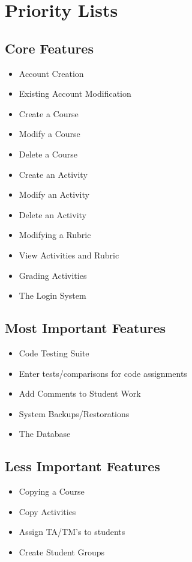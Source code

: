 \documentclass{article}
\begin{document}
\section{Priority Lists}
\subsection{Core Features}
\begin{itemize}
  \item Account Creation
  \item Existing Account Modification
  \item Create a Course
  \item Modify a Course
  \item Delete a Course
  \item Create an Activity
  \item Modify an Activity
  \item Delete an Activity
  \item Modifying a Rubric
  \item View Activities and Rubric
  \item Grading Activities
  \item The Login System
\end{itemize}

\subsection{Most Important Features}
\begin{itemize}
  \item Code Testing Suite
  \item Enter tests/comparisons for code assignments
  \item Add Comments to Student Work
  \item System Backups/Restorations
  \item The Database
\end{itemize}

\subsection{Less Important Features}
\begin{itemize}
  \item Copying a Course
  \item Copy Activities
  \item Assign TA/TM's to students
  \item Create Student Groups
\end{itemize}
\end{document}
